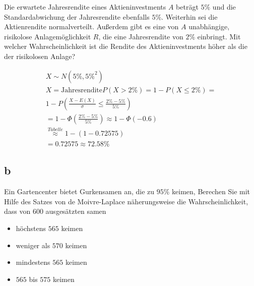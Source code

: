 Die erwartete Jahresrendite eines Aktieninvestments $A$ beträgt $5\%$ und die
Standardabwichung der Jahresrendite ebenfalls $5\%$. Weiterhin sei die
Aktienrendite normalverteilt. Außerdem gibt es eine von $A$ unabhängige,
risikolose Anlagemöglichkeit $R$, die eine Jahresrendite von $2\%$ einbringt.
Mit welcher Wahrscheinlichkeit ist die Rendite des Aktieninvestments höher als
die der risikolosen Anlage?

\begin{align*}
    X \sim N(5\%, 5\%^2)                                                 \\
    X = \text{Jahresrendite}
    P(X > 2\%) = 1 - P(X \leq 2\%) =                                     \\
    1 - P\left(\frac{X - E(X)}{\sigma} \leq \frac{2\% - 5\%}{5\%}\right) \\
    = 1 - \Phi\left(\frac{2\% - 5\%}{5\%}\right) \approx 1 - \Phi(-0.6)  \\
    \overset{Tabelle}{\approx} 1 - (1 - 0.72575)                         \\
    = 0.72575 \approx 72.58\%
\end{align*}

\subsection{b}

Ein Gartencenter bietet Gurkensamen an, die zu $95\%$ keimen, Berechen Sie mit
Hilfe des Satzes von de Moivre-Laplace näherungsweise die Wahrscheinlichkeit,
dass von 600 ausgesätzten samen

\begin{itemize}
    \item höchstens $565$ keimen
    \item weniger als $570$ keimen
    \item mindestens $565$ keimen
    \item $565$ bis $575$ keimen
\end{itemize}

